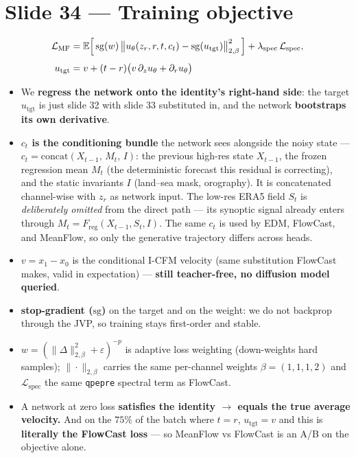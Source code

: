 \documentclass[11pt]{article}
\newcommand{\Ebb}{\mathbb{E}}
\newcommand{\Freg}{F_{\text{reg}}}
\begin{document}
\section*{Slide 34 --- Training objective}
\begin{align*}
  \mathcal{L}_{\text{MF}}
  &= \Ebb\Bigl[\, \mathrm{sg}(w)\,
       \bigl\| u_\theta(z_r, r, t, c_t) - \mathrm{sg}(u_{\text{tgt}}) \bigr\|_{2,\beta}^2
     \,\Bigr] + \lambda_{\text{spec}}\, \mathcal{L}_{\text{spec}}, \\[4pt]
  u_{\text{tgt}} &= v + (t - r)\bigl( v\, \partial_z u_\theta + \partial_r u_\theta \bigr)
\end{align*}
\begin{itemize}
  \item We \textbf{regress the network onto the identity's right-hand side}:
        the target $u_{\text{tgt}}$ is just slide 32 with slide 33 substituted
        in, and the network \textbf{bootstraps its own derivative}.
  \item \textbf{$c_t$ is the conditioning bundle} the network sees alongside
        the noisy state --- $c_t = \mathrm{concat}(X_{t-1},\, M_t,\, I)$:
        the previous high-res state $X_{t-1}$, the frozen regression mean
        $M_t$ (the deterministic forecast this residual is correcting), and the
        static invariants $I$ (land--sea mask, orography). It is concatenated
        channel-wise with $z_r$ as network input. The low-res ERA5 field $S_t$
        is \emph{deliberately omitted} from the direct path --- its synoptic
        signal already enters through $M_t = \Freg(X_{t-1}, S_t, I)$. The same
        $c_t$ is used by EDM, FlowCast, and MeanFlow, so only the generative
        trajectory differs across heads.
  \item $v = x_1 - x_0$ is the conditional I-CFM velocity (same substitution
        FlowCast makes, valid in expectation) --- \textbf{still teacher-free,
        no diffusion model queried}.
  \item \textbf{stop-gradient ($\mathrm{sg}$)} on the target and on the
        weight: we do not backprop through the JVP, so training stays
        first-order and stable.
  \item \textbf{$w = (\|\Delta\|_{2,\beta}^2 + \varepsilon)^{-p}$} is adaptive
        loss weighting (down-weights hard samples); \textbf{$\|\cdot\|_{2,\beta}$}
        carries the same per-channel weights $\beta = (1, 1, 1, 2)$ and
        \textbf{$\mathcal{L}_{\text{spec}}$} the same \texttt{qpepre} spectral
        term as FlowCast.
  \item A network at zero loss \textbf{satisfies the identity $\rightarrow$
        equals the true average velocity.} And on the $75\%$ of the batch where
        $t = r$, $u_{\text{tgt}} = v$ and this is \textbf{literally the
        FlowCast loss} --- so MeanFlow vs FlowCast is an A/B on the objective
        alone.
\end{itemize}
\end{document}
